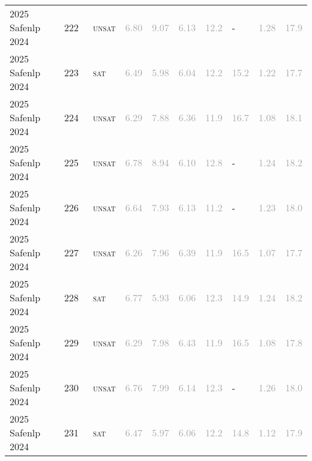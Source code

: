 \begin{center}
{\begin{longtable}{@{}llllllllll@{}}
2025 Safenlp 2024 & 222 & ~\textsc{unsat} & \textcolor{darkgray}{6.80} & \textcolor{darkgray}{9.07} & \textcolor{darkgray}{6.13} & \textcolor{darkgray}{12.2} & - & \textcolor{darkgray}{1.28} & \textcolor{darkgray}{17.9} \\
2025 Safenlp 2024 & 223 & ~\textsc{sat} & \textcolor{darkgray}{6.49} & \textcolor{darkgray}{5.98} & \textcolor{darkgray}{6.04} & \textcolor{darkgray}{12.2} & \textcolor{darkgray}{15.2} & \textcolor{darkgray}{1.22} & \textcolor{darkgray}{17.7} \\
2025 Safenlp 2024 & 224 & ~\textsc{unsat} & \textcolor{darkgray}{6.29} & \textcolor{darkgray}{7.88} & \textcolor{darkgray}{6.36} & \textcolor{darkgray}{11.9} & \textcolor{darkgray}{16.7} & \textcolor{darkgray}{1.08} & \textcolor{darkgray}{18.1} \\
2025 Safenlp 2024 & 225 & ~\textsc{unsat} & \textcolor{darkgray}{6.78} & \textcolor{darkgray}{8.94} & \textcolor{darkgray}{6.10} & \textcolor{darkgray}{12.8} & - & \textcolor{darkgray}{1.24} & \textcolor{darkgray}{18.2} \\
2025 Safenlp 2024 & 226 & ~\textsc{unsat} & \textcolor{darkgray}{6.64} & \textcolor{darkgray}{7.93} & \textcolor{darkgray}{6.13} & \textcolor{darkgray}{11.2} & - & \textcolor{darkgray}{1.23} & \textcolor{darkgray}{18.0} \\
2025 Safenlp 2024 & 227 & ~\textsc{unsat} & \textcolor{darkgray}{6.26} & \textcolor{darkgray}{7.96} & \textcolor{darkgray}{6.39} & \textcolor{darkgray}{11.9} & \textcolor{darkgray}{16.5} & \textcolor{darkgray}{1.07} & \textcolor{darkgray}{17.7} \\
2025 Safenlp 2024 & 228 & ~\textsc{sat} & \textcolor{darkgray}{6.77} & \textcolor{darkgray}{5.93} & \textcolor{darkgray}{6.06} & \textcolor{darkgray}{12.3} & \textcolor{darkgray}{14.9} & \textcolor{darkgray}{1.24} & \textcolor{darkgray}{18.2} \\
2025 Safenlp 2024 & 229 & ~\textsc{unsat} & \textcolor{darkgray}{6.29} & \textcolor{darkgray}{7.98} & \textcolor{darkgray}{6.43} & \textcolor{darkgray}{11.9} & \textcolor{darkgray}{16.5} & \textcolor{darkgray}{1.08} & \textcolor{darkgray}{17.8} \\
2025 Safenlp 2024 & 230 & ~\textsc{unsat} & \textcolor{darkgray}{6.76} & \textcolor{darkgray}{7.99} & \textcolor{darkgray}{6.14} & \textcolor{darkgray}{12.3} & - & \textcolor{darkgray}{1.26} & \textcolor{darkgray}{18.0} \\
2025 Safenlp 2024 & 231 & ~\textsc{sat} & \textcolor{darkgray}{6.47} & \textcolor{darkgray}{5.97} & \textcolor{darkgray}{6.06} & \textcolor{darkgray}{12.2} & \textcolor{darkgray}{14.8} & \textcolor{darkgray}{1.12} & \textcolor{darkgray}{17.9} \\

\end{longtable}}
\end{center}
